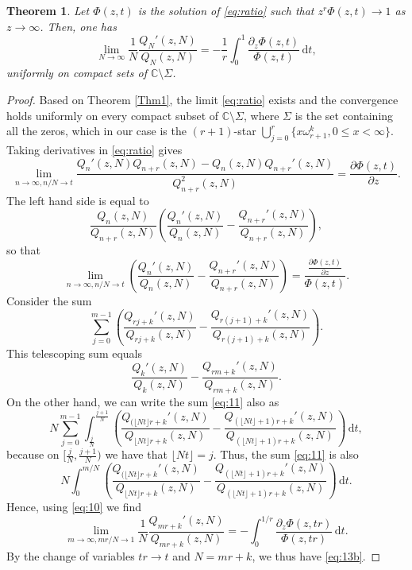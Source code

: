 \documentclass[12pt]{article}
\newtheorem{theorem}{Theorem}[section]
\numberwithin{equation}{section}
\begin{document}
\begin{theorem}  \label{prop:2}
Let \(\Phi(z,t)\) is the solution  of  \eqref{eq:ratio} such that $z^r\Phi(z,t) \to 1$ as $z \to \infty$. 
Then, one has 
\begin{equation}   \label{eq:13b}
   \lim_{N \to \infty} \frac{1}{N} \frac{Q_N'(z,N)}{Q_N(z,N)} = - \frac{1}{r} \int_0^1 \frac{\displaystyle \partial_z \Phi(z,t) }{\Phi(z,t)} \, \mathrm{d}t , 
\end{equation}
uniformly on compact sets of $\mathbb{C} \setminus \Sigma$. 
\end{theorem}

\begin{proof}
Based on  Theorem \ref{Thm1}, the limit \eqref{eq:ratio} exists and the convergence holds uniformly on every compact subset of $\mathbb{C} \setminus \Sigma$, where $\Sigma$ is the set containing all the zeros, which in our case is the
$(r+1)$-star $\bigcup_{j=0}^r \{ x \omega_{r+1}^k, 0 \leq x < \infty \}$.
Taking derivatives in \eqref{eq:ratio} gives
\[   \lim_{n \to \infty, n/N \to t} \frac{Q_n'(z,N)Q_{n+r}(z,N) - Q_n(z,N)Q_{n+r}'(z,N)}{Q_{n+r}^2(z,N)} = \frac{\partial \Phi(z,t)}{\partial z} . \]
The left hand side is equal to
\[    \frac{Q_n(z,N)}{Q_{n+r}(z,N)} \left( \frac{Q_n'(z,N)}{Q_n(z,N)} - \frac{Q_{n+r}'(z,N)}{Q_{n+r}(z,N)} \right), \]
so that
\begin{equation}  \label{eq:10}
   \lim_{n \to \infty, n/N \to t} \left( \frac{Q_n'(z,N)}{Q_n(z,N)} - \frac{Q_{n+r}'(z,N)}{Q_{n+r}(z,N)} \right) = \frac{\displaystyle \frac{\partial \Phi(z,t)}{\partial z} }{\Phi(z,t)} .
\end{equation}
Consider the sum
\begin{equation}   \label{eq:11}
   \sum_{j=0}^{m-1}  \left( \frac{Q_{rj+k}'(z,N)}{Q_{rj+k}(z,N)} - \frac{Q_{r(j+1)+k}'(z,N)}{Q_{r(j+1)+k}(z,N)} \right).
\end{equation}
This telescoping sum equals
\[    \frac{Q_k'(z,N)}{Q_k(z,N)} - \frac{Q_{rm+k}'(z,N)}{Q_{rm+k}(z,N)}.  \]
On the other hand, we can write the sum \eqref{eq:11} also as
\[   N  \sum_{j=0}^{m-1} \int_{\frac{j}N}^{\frac{j+1}N}  \left( \frac{Q_{(\lfloor Nt \rfloor r+k}'(z,N)}{Q_{\lfloor Nt \rfloor r+k}(z,N)} - \frac{Q_{(\lfloor Nt \rfloor +1)r+k}'(z,N)}{Q_{(\lfloor Nt\rfloor +1)r+k}(z,N)} \right)\, \mathrm{d}t, \]
because on $[\frac{j}{N},\frac{j+1}{N})$ we have that $\lfloor Nt \rfloor = j$. Thus, the sum \eqref{eq:11} is also
\[   N \int_0^{m/N}   \left( \frac{Q_{(\lfloor Nt \rfloor r+k}'(z,N)}{Q_{\lfloor Nt \rfloor r+k}(z,N)} - \frac{Q_{(\lfloor Nt \rfloor +1)r+k}'(z,N)}{Q_{(\lfloor Nt \rfloor +1)r+k}(z,N)} \right) \, \mathrm{d}t.  \]
Hence, using \eqref{eq:10} we find
\begin{equation}  \label{eq:12}
  \lim_{m \to \infty, mr/N \to 1} \frac{1}{N} \frac{Q_{mr+k}'(z,N)}{Q_{mr+k}(z,N)} = - \int_0^{1/r} \frac{\displaystyle \partial_z \Phi(z,tr) }{\Phi(z,tr)} \, \mathrm{d}t. 
\end{equation}
By the change of variables $tr \to t$ and $N=mr+k$, we thus have \eqref{eq:13b}.
\end{proof}
\end{document}
